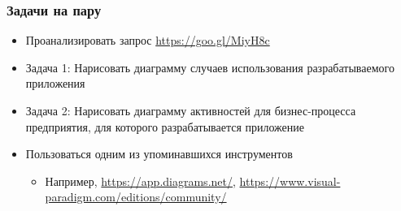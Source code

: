 \documentclass{../../slides-style}
\begin{document}
    \begin{frame}
        \frametitle{Задачи на пару}
        \begin{itemize}
            \item Проанализировать запрос \url{https://goo.gl/MiyH8c}
            \item Задача 1: Нарисовать диаграмму случаев использования разрабатываемого приложения
            \item Задача 2: Нарисовать диаграмму активностей для бизнес-процесса предприятия, для которого разрабатывается приложение
            \item Пользоваться одним из упоминавшихся инструментов
            \begin{itemize}
                \item Например, \url{https://app.diagrams.net/}, \url{https://www.visual-paradigm.com/editions/community/}
            \end{itemize}
        \end{itemize}
    \end{frame}
\end{document}
